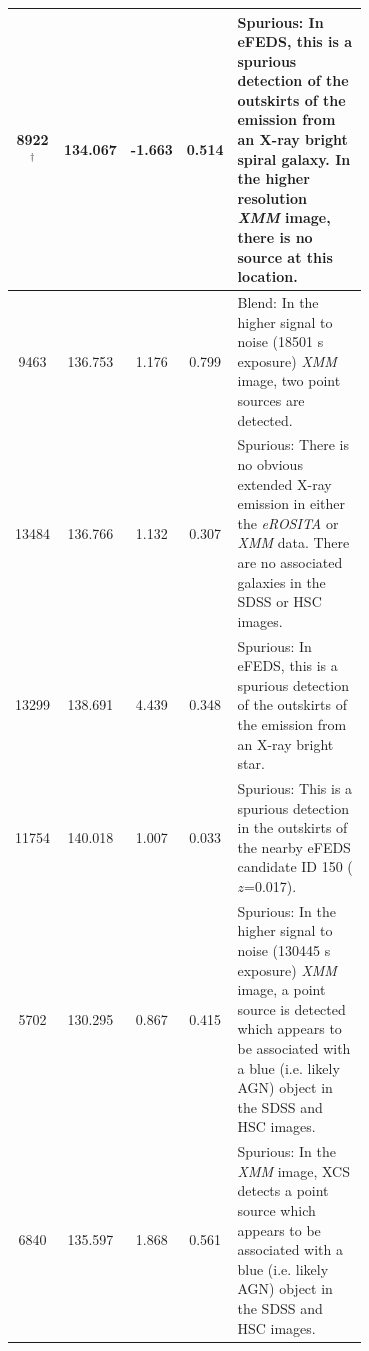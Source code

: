\documentclass[fleqn,usenatbib]{mnras}
\begin{document}
\begin{table}
\begin{center}
\begin{tabular}{cccc|p{0.70\linewidth}}
\hline
8922$^\dagger$ & 134.067 & -1.663 & 0.514 & Spurious: In eFEDS, this is a spurious detection of the outskirts of the emission from an X-ray bright spiral galaxy. In the higher resolution {\em XMM} image, there is no source at this location.\\ 
\hline
9463 & 136.753 & 1.176 & 0.799 & Blend: In the higher signal to noise (18501 s exposure) {\em XMM} image, two point sources are detected. \\ 
\hline
13484 & 136.766 & 1.132 & 0.307 & Spurious: There is no obvious extended X-ray emission in either the {\em eROSITA} or {\em XMM} data.  There are no associated galaxies in the SDSS or HSC images. \\ 
\hline
13299 & 138.691 & 4.439 & 0.348 & Spurious: In eFEDS, this is a spurious detection of the outskirts of the emission from an X-ray bright star. \\ 
\hline
11754 & 140.018 & 1.007 & 0.033 & Spurious: This is a spurious detection in the outskirts of the nearby eFEDS candidate ID 150 ($z$=0.017). \\ 
\hline
5702 & 130.295 & 0.867 & 0.415 & Spurious: In the higher signal to noise (130445 s exposure) {\em XMM} image, a point source is detected which appears to be associated with a  blue (i.e. likely AGN) object in the SDSS and HSC images.\\
\hline
6840 & 135.597 & 1.868 & 0.561 & Spurious: In the {\em XMM} image, XCS detects a point source which appears to be associated with a  blue (i.e. likely AGN) object in the SDSS and HSC images. \\ 
\hline
\end{tabular}
\end{center}
\end{table}
\end{document}
